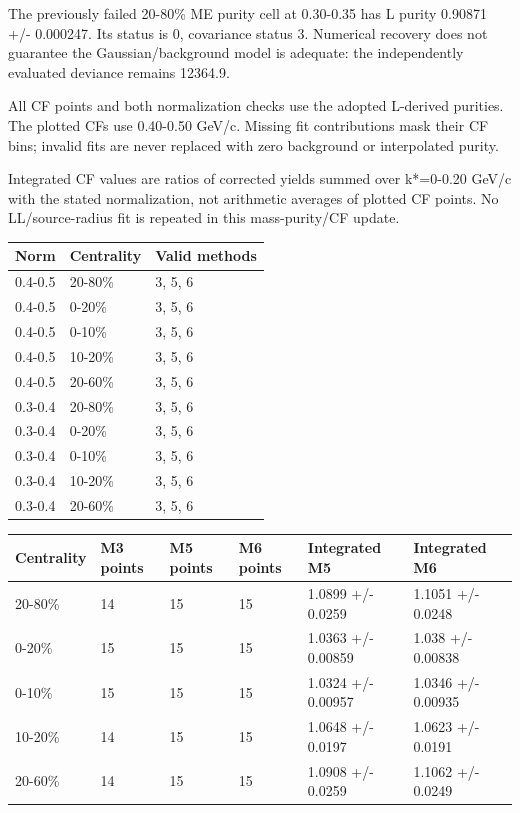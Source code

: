 \documentclass[10pt,a4paper]{article}
\begin{document}
The previously failed 20-80\% ME purity cell at 0.30-0.35 has L purity 0.90871 +/- 0.000247. Its status is 0, covariance status 3. Numerical recovery does not guarantee the Gaussian/background model is adequate: the independently evaluated deviance remains 12364.9.

All CF points and both normalization checks use the adopted L-derived purities. The plotted CFs use 0.40-0.50 GeV/c. Missing fit contributions mask their CF bins; invalid fits are never replaced with zero background or interpolated purity.

Integrated CF values are ratios of corrected yields summed over k*=0-0.20 GeV/c with the stated normalization, not arithmetic averages of plotted CF points. No LL/source-radius fit is repeated in this mass-purity/CF update.

{\small\setlength{\tabcolsep}{3pt}\begin{longtable}{lll}\toprule
Norm & Centrality & Valid methods\\\midrule\endhead
0.4-0.5 & 20-80\% & 3, 5, 6\\
0.4-0.5 & 0-20\% & 3, 5, 6\\
0.4-0.5 & 0-10\% & 3, 5, 6\\
0.4-0.5 & 10-20\% & 3, 5, 6\\
0.4-0.5 & 20-60\% & 3, 5, 6\\
0.3-0.4 & 20-80\% & 3, 5, 6\\
0.3-0.4 & 0-20\% & 3, 5, 6\\
0.3-0.4 & 0-10\% & 3, 5, 6\\
0.3-0.4 & 10-20\% & 3, 5, 6\\
0.3-0.4 & 20-60\% & 3, 5, 6\\
\bottomrule\end{longtable}}
{\small\setlength{\tabcolsep}{3pt}\begin{longtable}{llllll}\toprule
Centrality & M3 points & M5 points & M6 points & Integrated M5 & Integrated M6\\\midrule\endhead
20-80\% & 14 & 15 & 15 & 1.0899 +/- 0.0259 & 1.1051 +/- 0.0248\\
0-20\% & 15 & 15 & 15 & 1.0363 +/- 0.00859 & 1.038 +/- 0.00838\\
0-10\% & 15 & 15 & 15 & 1.0324 +/- 0.00957 & 1.0346 +/- 0.00935\\
10-20\% & 14 & 15 & 15 & 1.0648 +/- 0.0197 & 1.0623 +/- 0.0191\\
20-60\% & 14 & 15 & 15 & 1.0908 +/- 0.0259 & 1.1062 +/- 0.0249\\
\bottomrule\end{longtable}}
\end{document}
